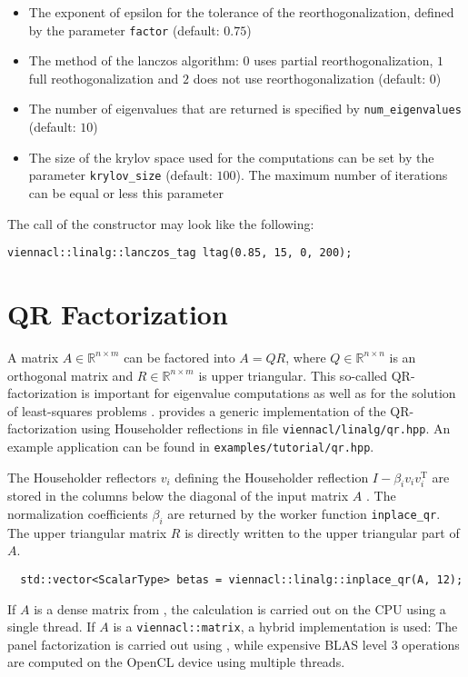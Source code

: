 \begin{itemize}
 \item The exponent of epsilon for the tolerance of the reorthogonalization, defined by the parameter \lstinline|factor| (default: $0.75$)
 \item The method of the lanczos algorithm: $0$ uses partial reorthogonalization, $1$ full reothogonalization and $2$ does not use reorthogonalization (default: $0$)
 \item The number of eigenvalues that are returned is specified by \lstinline|num_eigenvalues| (default: $10$)
 \item The size of the krylov space used for the computations can be set by the parameter \lstinline|krylov_size| (default: $100$). The maximum number of iterations can be equal or less this parameter
\end{itemize}
The call of the constructor may look like the following:
\begin{lstlisting}
viennacl::linalg::lanczos_tag ltag(0.85, 15, 0, 200);
\end{lstlisting}



\section{QR Factorization}

A matrix $A \in \mathbb{R}^{n\times m}$ can be factored into $A = Q R$, where $Q \in \mathbb{R}^{n\times n}$ is an
orthogonal matrix and $R \in \mathbb{R}^{n \times m}$ is upper triangular. This so-called QR-factorization is important for eigenvalue computations as well as
for the solution of least-squares problems \cite{golub:matrix-computations}. {\ViennaCL} provides a generic implementation of the QR-factorization using
Householder reflections in file \lstinline|viennacl/linalg/qr.hpp|. An example application can be found in \lstinline|examples/tutorial/qr.hpp|.

The Householder reflectors $v_i$ defining the Householder reflection $I - \beta_i v_i v_i^{\mathrm{T}}$ are stored in the
columns below the diagonal of the input matrix $A$ \cite{golub:matrix-computations}. The normalization coefficients $\beta_i$ are returned by the
worker function \lstinline|inplace_qr|. The upper triangular matrix $R$ is directly written to the upper triangular part of $A$. 
\begin{lstlisting}
  std::vector<ScalarType> betas = viennacl::linalg::inplace_qr(A, 12);
\end{lstlisting}
If $A$ is a dense matrix from \ublas, the calculation is carried out on the CPU using a single thread. If $A$ is a 
\lstinline|viennacl::matrix|, a hybrid implementation is used: The panel factorization is carried out using \ublas, while expensive BLAS level 3 operations
are computed on the OpenCL device using multiple threads. 

